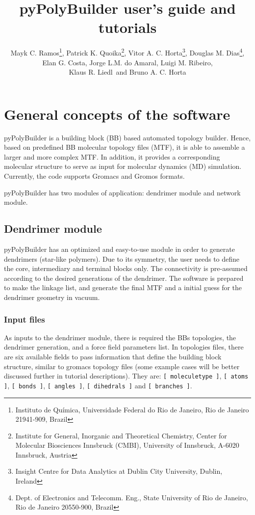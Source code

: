\documentclass[12pt]{article}
\title{pyPolyBuilder user's guide and tutorials}
\author{
	Mayk C. Ramos\thanks{Instituto de Qu\'imica, Universidade Federal do Rio de Janeiro, Rio de Janeiro 21941-909, Brazil},
	Patrick K. Quoika\thanks{Institute for General, Inorganic and Theoretical Chemistry, Center for Molecular Biosciences Innsbruck (CMBI), University of Innsbruck, A-6020 Innsbruck, Austria}, 
	Vitor A. C. Horta\thanks{Insight Centre for Data Analytics at Dublin City University, Dublin, Ireland},
	Douglas M. Dias\thanks{Dept. of Electronics and Telecomm. Eng., State University of Rio de Janeiro, Rio de Janeiro 20550-900, Brazil},\\
	Elan G. Costa\samethanks{},
	Jorge L.M. do Amaral\samethanks{},
	Luigi M. Ribeiro\samethanks{},\\
	Klaus R. Liedl\samethanks[2]\  and 
	Bruno A. C. Horta\samethanks[1]
}
\begin{document}
\maketitle

\begin{abstract}
\end{abstract}

\tableofcontents

\renewcommand{\baselinestretch}{1.5}
\normalsize

\section{General concepts of the software}

pyPolyBuilder is a building block (BB) based automated topology builder.
Hence, based on predefined BB molecular topology files (MTF), it is able to assemble a larger and more complex MTF. In addition, it provides a corresponding molecular structure to serve as input for molecular dynamics (MD) simulation.
Currently, the code supports Gromacs and Gromos formats.

pyPolyBuilder has two modules of application: dendrimer module and network module.

\subsection{Dendrimer module}
pyPolyBuilder has an optimized and easy-to-use module in order to generate dendrimers (star-like polymers).
Due to its symmetry, the user needs to define the core, intermediary and terminal blocks only.
The connectivity is pre-assumed according to the desired generations of the dendrimer.
The software is prepared to make the linkage list, and generate the final MTF and a initial guess for the dendrimer geometry in vacuum.

\subsubsection{Input files}
\label{sec:DENDinputFiles}
As inputs to the dendrimer module, there is required the BBs topologies, the dendrimer generation, and a force field parameters list.
In topologies files, there are six available fields to pass information that define the building block structure, similar to gromacs topology files (some example cases will be better discussed further in tutorial descriptions).
They are: \texttt{[ moleculetype ]}, \texttt{[ atoms ]}, \texttt{[ bonds ]}, \texttt{[ angles ]}, \texttt{[ dihedrals ]} and \texttt{[ branches ]}.
\end{document}
